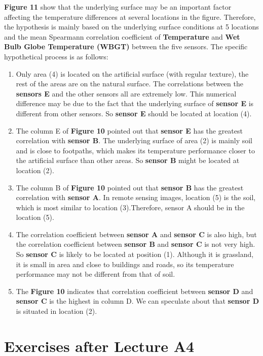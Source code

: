 \documentclass[a4paper]{article}
\begin{document}
\noindent \textbf{Figure 11} show that the underlying surface may be an important factor affecting the temperature differences at several locations in the figure. Therefore, the hypothesis is mainly based on the underlying surface conditions at 5 locations and the mean Spearmann correlation coefficient of \textbf{Temperature} and \textbf{Wet Bulb Globe Temperature (WBGT)} between the five sensors. The specific hypothetical process is as follows:
\begin{enumerate}
\item Only area (4) is located on the artificial surface (with regular texture), the rest of the areas are on the natural surface. The correlations between the \textbf{sensors E} and the other sensors all are extremely low. This numerical difference may be due to the fact that the underlying surface of \textbf{sensor E} is different from other sensors. So \textbf{sensor E} should be located at location (4).
\item The column E of \textbf{Figure 10} pointed out that \textbf{sensor E} has the greatest correlation with \textbf{sensor B}. The underlying surface of area (2) is mainly soil and is close to footpaths, which makes its temperature performance closer to the artificial surface than other areas. So \textbf{sensor B} might be located at location (2).
\item The column B of \textbf{Figure 10} pointed out that \textbf{sensor B} has the greatest correlation with \textbf{sensor A}. In remote sensing images, location (5) is the soil, which is most similar to location (3).Therefore, sensor A should be in the location (5).
\item The correlation coefficient between \textbf{sensor A} and \textbf{sensor C} is also high, but the correlation coefficient between \textbf{sensor B} and  \textbf{sensor C} is not very high. So \textbf{sensor C} is likely to be located at position (1). Although it is grassland, it is small in area and close to buildings and roads, so its temperature performance may not be different from that of soil.
\item The \textbf{Figure 10} indicates that correlation coefficient between \textbf{sensor D} and \textbf{sensor C} is the highest in column D. We can speculate about that \textbf{sensor D} is situated in location (2).
\end{enumerate}

\section{Exercises after Lecture A4}
\end{document}
